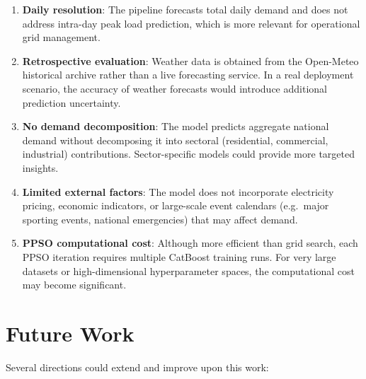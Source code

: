 \begin{enumerate}
    \item \textbf{Daily resolution}: The pipeline forecasts total daily demand and does not address intra-day peak load prediction, which is more relevant for operational grid management.
    
    \item \textbf{Retrospective evaluation}: Weather data is obtained from the Open-Meteo historical archive rather than a live forecasting service. In a real deployment scenario, the accuracy of weather forecasts would introduce additional prediction uncertainty.
    
    \item \textbf{No demand decomposition}: The model predicts aggregate national demand without decomposing it into sectoral (residential, commercial, industrial) contributions. Sector-specific models could provide more targeted insights.
    
    \item \textbf{Limited external factors}: The model does not incorporate electricity pricing, economic indicators, or large-scale event calendars (e.g.\ major sporting events, national emergencies) that may affect demand.
    
    \item \textbf{PPSO computational cost}: Although more efficient than grid search, each PPSO iteration requires multiple CatBoost training runs. For very large datasets or high-dimensional hyperparameter spaces, the computational cost may become significant.
\end{enumerate}


\section{Future Work}

Several directions could extend and improve upon this work:

